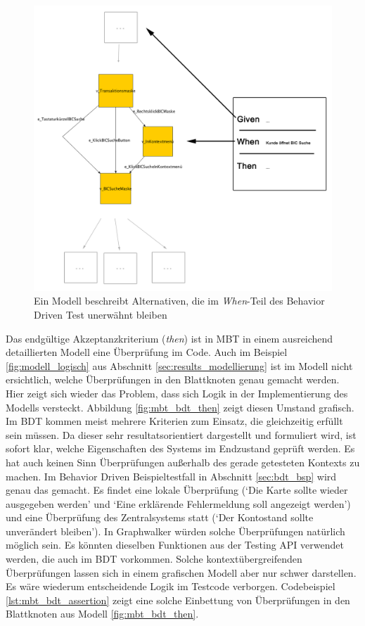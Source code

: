 \begin{figure} 
  \centering
     \includegraphics[width=1\textwidth]{figures/mbt_bdt_when.png}
  \caption{Ein Modell beschreibt Alternativen, die im \textit{When}-Teil des Behavior Driven Test unerwähnt bleiben}
  \label{fig:mbt_bdt_when}
\end{figure}

Das endgültige Akzeptanzkriterium (\textit{then}) ist in \Gls{MBT} in einem ausreichend detaillierten Modell eine Überprüfung im Code. Auch im Beispiel \ref{fig:modell_logisch} aus Abschnitt \ref{sec:results_modellierung} ist im Modell nicht ersichtlich, welche Überprüfungen in den Blattknoten genau gemacht werden. Hier zeigt sich wieder das Problem, dass sich Logik in der Implementierung des Modells versteckt. Abbildung \ref{fig:mbt_bdt_then} zeigt diesen Umstand grafisch. Im \Gls{BDT} kommen meist mehrere Kriterien zum Einsatz, die gleichzeitig erfüllt sein müssen. Da dieser sehr resultatsorientiert dargestellt und formuliert wird, ist sofort klar, welche Eigenschaften des Systems im Endzustand geprüft werden. Es hat auch keinen Sinn Überprüfungen außerhalb des gerade getesteten Kontexts zu machen. Im Behavior Driven Beispieltestfall in Abschnitt \ref{sec:bdt_bsp} wird genau das gemacht. Es findet eine lokale Überprüfung (`Die Karte sollte wieder ausgegeben werden' und `Eine erklärende Fehlermeldung soll angezeigt werden') und eine Überprüfung des Zentralsystems statt (`Der Kontostand sollte unverändert bleiben'). In Graphwalker würden solche Überprüfungen natürlich möglich sein. Es könnten dieselben Funktionen aus der Testing API verwendet werden, die auch im \Gls{BDT} vorkommen. Solche kontextübergreifenden Überprüfungen lassen sich in einem grafischen Modell aber nur schwer darstellen. Es wäre wiederum entscheidende Logik im Testcode verborgen. Codebeispiel \ref{lst:mbt_bdt_assertion} zeigt eine solche Einbettung von Überprüfungen in den Blattknoten aus Modell \ref{fig:mbt_bdt_then}.


